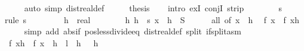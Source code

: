 \begin{isabellebody}
\ \ \ \ \isamarkupfalse%
\ {\isacharparenleft}{\kern0pt}auto\ simp{\isacharcolon}{\kern0pt}\ dist{\isacharunderscore}{\kern0pt}real{\isacharunderscore}{\kern0pt}def{\isacharparenright}{\kern0pt}\isanewline
\ \ \isamarkupfalse%
\ \isamarkupfalse%
\ {\isacharquery}{\kern0pt}thesis\isanewline
\ \ \isamarkupfalse%
\ {\isacharparenleft}{\kern0pt}intro\ exI\ conjI\ strip{\isacharparenright}{\kern0pt}\isanewline
\ \ \ \ \isamarkupfalse%
\ {\isachardoublequoteopen}{}\ {\isacharless}{\kern0pt}\ s{\isachardoublequoteclose}\ \isamarkupfalse%
\ {\isacharparenleft}{\kern0pt}rule\ s{\isacharparenright}{\kern0pt}\isanewline
\ \ \isamarkupfalse%
\isanewline
\ \ \ \ \isamarkupfalse%
\ h\ {\isacharcolon}{\kern0pt}{\isacharcolon}{\kern0pt}\ real\isanewline
\ \ \ \ \isamarkupfalse%
\ {\isachardoublequoteopen}{}\ {\isacharless}{\kern0pt}\ h{\isachardoublequoteclose}\ {\isachardoublequoteopen}h\ {\isacharless}{\kern0pt}\ s{\isachardoublequoteclose}\ {\isachardoublequoteopen}x\ {\isacharminus}{\kern0pt}\ h\ {\isasymin}\ S{\isachardoublequoteclose}\isanewline
\ \ \ \ \isamarkupfalse%
\ all\ {\isacharbrackleft}{\kern0pt}of\ {\isachardoublequoteopen}x\ {\isacharminus}{\kern0pt}\ h{\isachardoublequoteclose}{\isacharbrackright}{\kern0pt}\ \isamarkupfalse%
\ {\isachardoublequoteopen}f\ x\ {\isacharless}{\kern0pt}\ f\ {\isacharparenleft}{\kern0pt}x{\isacharminus}{\kern0pt}h{\isacharparenright}{\kern0pt}{\isachardoublequoteclose}\isanewline
\ \ \ \ \isamarkupfalse%
\ {\isacharparenleft}{\kern0pt}simp\ add{\isacharcolon}{\kern0pt}\ abs{\isacharunderscore}{\kern0pt}if\ pos{\isacharunderscore}{\kern0pt}less{\isacharunderscore}{\kern0pt}divide{\isacharunderscore}{\kern0pt}eq\ dist{\isacharunderscore}{\kern0pt}real{\isacharunderscore}{\kern0pt}def\ split{\isacharcolon}{\kern0pt}\ if{\isacharunderscore}{\kern0pt}split{\isacharunderscore}{\kern0pt}asm{\isacharparenright}{\kern0pt}\isanewline
\ \ \ \ \ \ \isamarkupfalse%
\ {\isachardoublequoteopen}{\isacharminus}{\kern0pt}\ {\isacharparenleft}{\kern0pt}{\isacharparenleft}{\kern0pt}f\ {\isacharparenleft}{\kern0pt}x{\isacharminus}{\kern0pt}h{\isacharparenright}{\kern0pt}\ {\isacharminus}{\kern0pt}\ f\ x{\isacharparenright}{\kern0pt}\ {\isacharslash}{\kern0pt}\ h{\isacharparenright}{\kern0pt}\ {\isacharless}{\kern0pt}\ l{\isachardoublequoteclose}\ \ h{\isacharcolon}{\kern0pt}\ {\isachardoublequoteopen}{}\ {\isacharless}{\kern0pt}\ h{\isachardoublequoteclose}\isanewline

\end{isabellebody}
